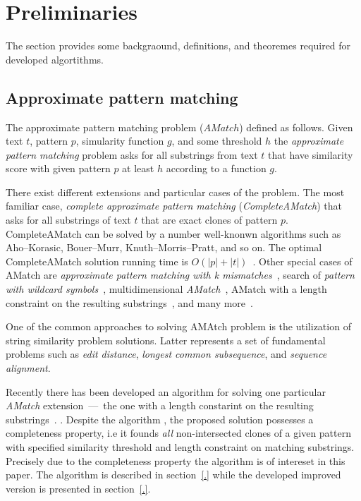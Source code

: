 \section{Preliminaries}
\label{section:preliminaries}

The section provides some backgraound, definitions, and theoremes required for
developed algortithms.

\subsection{Approximate pattern matching}
The approximate pattern matching problem ($AMatch$) defined as follows.
Given text $t$, pattern $p$, simularity function $g$, and some threshold $h$ the \emph{approximate pattern matching} problem asks for all substrings from text $t$ that have similarity score  with given pattern $p$ at least $h$ according to a function $g$.  

There exist different extensions and particular cases of the problem.
The most familiar case, \emph{complete approximate pattern matching} (\emph{CompleteAMatch}) that asks for all substrings of text $t$ that are exact clones of pattern $p$.
CompleteAMatch can be solved by a number well-knonwn algorithms such as Aho--Korasic, Bouer--Murr, Knuth--Morris--Pratt, and so on.
The optimal CompleteAMatch solution running time is $O(|p|+|t|)$~\cite{.}.
Other special cases of AMatch are \emph{approximate pattern matching with k mismatches}~\cite{.}, search of \emph{pattern with wildcard symbols}~\cite{.}, multidimensional \emph{AMatch}~\cite{.}, AMatch with a length constraint on the resulting substrings~\cite{.}, and many more~\cite{.}.

One of the common approaches to solving AMAtch problem is the utilization of string similarity problem solutions.
Latter represents a set of fundamental problems such as \emph{edit distance}, \emph{longest common subsequence}, and \emph{sequence alignment}.

Recently there has been developed an algorithm for solving one particular \emph{AMatch} extension~---~the one with a length constarint on the resulting substrings~\cite{.}.
.
Despite the algorithm , the proposed solution possesses a completeness property, i.e it founds \emph{all} non-intersected clones of a given pattern with specified similarity threshold and length constraint on matching substrings.
Precisely due to the completeness property the algorithm is of intereset in this paper.
The algorithm is described in section~\ref{.} while the developed improved version is presented in section~\ref{.}.

